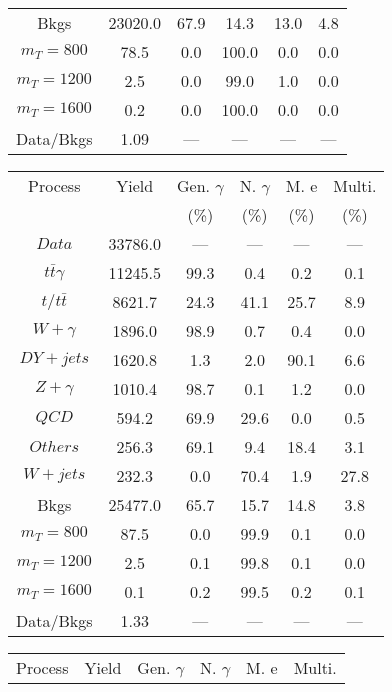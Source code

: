 \begin{figure}
\begin{minipage}[c]{0.32\textwidth}
{\begin{tabular}{cccccc}
Bkgs &  23020.0 &  67.9 &  14.3 &  13.0 &  4.8\\
$ m_{T} = 800 $ &  78.5 &  0.0 &  100.0 &  0.0 &  0.0\\
$ m_{T} = 1200 $ &  2.5 &  0.0 &  99.0 &  1.0 &  0.0\\
$ m_{T} = 1600 $ &  0.2 &  0.0 &  100.0 &  0.0 &  0.0\\
Data/Bkgs &  1.09 &  --- &  --- &  --- &  ---\\
\hline
\end{tabular}
}
\end{minipage}
\begin{minipage}[c]{0.32\textwidth}
\centering
\tiny{
\begin{tabular}{cccccc}
\hline
Process & Yield & Gen. $\gamma$ & N. $\gamma$ & M. e & Multi. \\
 &  & (\%) & (\%) & (\%) & (\%)  \\
\hline
                                                                      $ Data $ &  33786.0 &  --- &  --- &  --- &  ---\\
$ t\bar{t}\gamma $ &  11245.5 &  99.3 &  0.4 &  0.2 &  0.1\\
$ t/t\bar{t} $ &  8621.7 &  24.3 &  41.1 &  25.7 &  8.9\\
$ W+\gamma $ &  1896.0 &  98.9 &  0.7 &  0.4 &  0.0\\
$ DY+jets $ &  1620.8 &  1.3 &  2.0 &  90.1 &  6.6\\
$ Z+\gamma $ &  1010.4 &  98.7 &  0.1 &  1.2 &  0.0\\
$ QCD $ &  594.2 &  69.9 &  29.6 &  0.0 &  0.5\\
$ Others $ &  256.3 &  69.1 &  9.4 &  18.4 &  3.1\\
$ W+jets $ &  232.3 &  0.0 &  70.4 &  1.9 &  27.8\\
Bkgs &  25477.0 &  65.7 &  15.7 &  14.8 &  3.8\\
$ m_{T} = 800 $ &  87.5 &  0.0 &  99.9 &  0.1 &  0.0\\
$ m_{T} = 1200 $ &  2.5 &  0.1 &  99.8 &  0.1 &  0.0\\
$ m_{T} = 1600 $ &  0.1 &  0.2 &  99.5 &  0.2 &  0.1\\
Data/Bkgs &  1.33 &  --- &  --- &  --- &  ---\\
\hline
\end{tabular}
}
\end{minipage}
\begin{minipage}[c]{0.32\textwidth}
\centering
\tiny{
\begin{tabular}{cccccc}
\hline
Process & Yield & Gen. $\gamma$ & N. $\gamma$ & M. e & Multi. \\

\end{tabular}}
\end{minipage}
\end{figure}
